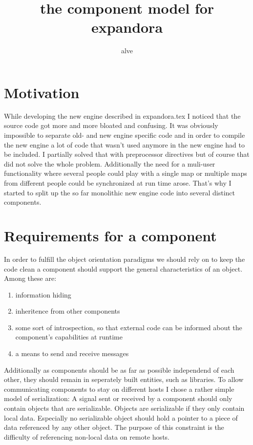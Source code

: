 \documentclass[11pt]{article}
\author{alve}
\begin{document}
\title{the component model for expandora}
\maketitle

\section{Motivation}
While developing the new engine described in expandora.tex I noticed that 
the source code got more and more bloated and confusing. It was obviously 
impossible to separate old- and new engine specific code and in order
to compile the new engine a lot of code that wasn't used anymore in the
new engine had to be included. I partially solved that with preprocessor
directives but of course that did not solve the whole problem.
Additionally the need for a muli-user functionality where several people could 
play with a single map or multiple maps from different people could be 
synchronized at run time arose. That's why I started to split up the so far
monolithic new engine code into several distinct components.

\section{Requirements for a component}
In order to fulfill the object orientation paradigms we should rely on to
keep the code clean a component should support the general characteristics 
of an object. Among these are:
\begin{enumerate}
\item information hiding
\item inheritence from other components
\item some sort of introspection, so that external code can be informed about 
the component's capabilities at runtime
\item a means to send and receive messages
\end{enumerate}
Additionally as components should be as far as possible independend of each 
other, they should remain in seperately built entities, such as libraries.
To allow communicating components to stay on different hosts I chose a rather
simple model of serialization: A signal sent or received by a component should
only contain objects that are serializable. Objects are serializable if they 
only contain local data. Especially no serializable object should hold a pointer
to a piece of data referenced by any other object. The purpose of this 
constraint is the difficulty of referencing non-local data on remote hosts.
\end{document}
